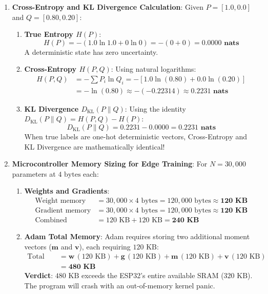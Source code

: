 \begin{enumerate}
    \item \textbf{Cross-Entropy and KL Divergence Calculation}:
    Given $P = [1.0, 0.0]$ and $Q = [0.80, 0.20]$:
    \begin{enumerate}[label=(\alph*)]
        \item \textbf{True Entropy $H(P)$}:
        \begin{equation*}
        H(P) = -(1.0 \ln 1.0 + 0 \ln 0) = -(0 + 0) = \mathbf{0.0000\text{ nats}}
        \end{equation*}
        A deterministic state has zero uncertainty.
        \item \textbf{Cross-Entropy $H(P, Q)$}:
        Using natural logarithms:
        \begin{align*}
        H(P, Q) &= -\sum P_i \ln Q_i = -\left[ 1.0 \ln(0.80) + 0.0 \ln(0.20) \right] \\
        &= -\ln(0.80) \approx -(-0.22314) \approx \mathbf{0.2231\text{ nats}}
        \end{align*}
        \item \textbf{KL Divergence $D_{\text{KL}}(P \parallel Q)$}:
        Using the identity $D_{\text{KL}}(P \parallel Q) = H(P, Q) - H(P)$:
        \begin{equation*}
        D_{\text{KL}}(P \parallel Q) = 0.2231 - 0.0000 = \mathbf{0.2231\text{ nats}}
        \end{equation*}
        When true labels are one-hot deterministic vectors, Cross-Entropy and KL Divergence are mathematically identical!
    \end{enumerate}

    \item \textbf{Microcontroller Memory Sizing for Edge Training}:
    For $N = 30{,}000$ parameters at $4\text{ bytes}$ each:
    \begin{enumerate}[label=(\alph*)]
        \item \textbf{Weights and Gradients}:
        \begin{align*}
        \text{Weight memory} &= 30{,}000 \times 4\text{ bytes} = 120{,}000\text{ bytes} \approx \mathbf{120\text{ KB}} \\
        \text{Gradient memory} &= 30{,}000 \times 4\text{ bytes} = 120{,}000\text{ bytes} \approx \mathbf{120\text{ KB}} \\
        \text{Combined} &= 120\text{ KB} + 120\text{ KB} = \mathbf{240\text{ KB}}
        \end{align*}
        
        \item \textbf{Adam Total Memory}:
        Adam requires storing two additional moment vectors ($\mathbf{m}$ and $\mathbf{v}$), each requiring $120\text{ KB}$:
        \begin{align*}
        \text{Total Adam Memory} &= \mathbf{w}\,(120\text{ KB}) + \mathbf{g}\,(120\text{ KB}) + \mathbf{m}\,(120\text{ KB}) + \mathbf{v}\,(120\text{ KB}) \\
        &= \mathbf{480\text{ KB}}
        \end{align*}
        \textbf{Verdict}: $480\text{ KB}$ exceeds the ESP32's entire available SRAM ($320\text{ KB}$). The program will crash with an out-of-memory kernel panic.
        

\end{enumerate}
\end{enumerate}
